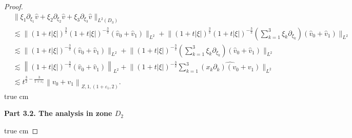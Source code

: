 \documentclass[11pt,twoside]{article}
\newcommand{\p}{\partial}
\newcommand{\f}{\frac}
\theoremstyle{plain}
\theoremstyle{definition}
\theoremstyle{remark}
\numberwithin{equation}{section}
\begin{document}
\begin{proof}
\begin{equation}
\begin{aligned}
&\big\|\xi_1\p_{\xi_1}\hat{v}+\xi_2\p_{\xi_2}\hat{v}+\xi_3\p_{\xi_3}\hat{v}\big\|_{L^2(D_3)}\\
&\lesssim \big\|(1+t|\xi|)^{\f32}(1+t|\xi|)^{-\f32}(\hat{v}_{0}+\hat{v}_{1})\big\|_{L^{2}}+ \big\|(1+t|\xi|)^{\f32}(1+t|\xi|)^{-\f32}(\sum_{k=1}^3\xi_k\p_{\xi_k})(\hat{v}_{0}+\hat{v}_{1})\big\|_{L^{2}}\\
&\lesssim \big\|(1+t|\xi|)^{-\f32}(\hat{v}_{0}+\hat{v}_{1})\big\|_{L^{2}}+ \big\|(1+t|\xi|)^{-\f32}(\sum_{k=1}^3\xi_k\p_{\xi_k})(\hat{v}_{0}+\hat{v}_{1})\big\|_{L^{2}}\\
& \lesssim \left\|(1+t|\xi|)^{-\f{3}{2}}(\hat{v}_{0}+\hat{v}_{1})\right\|_{L^{2}}+
\big\|(1+t|\xi|)^{-\f{3}{2}}\sum_{k=1}^3\widehat{(x_k\p_k)(v_0+v_1)}\big\|_{L^{2}}\\
&\lesssim  t^{\f32-\f{3}{1+\varepsilon_1}}\left\|v_0+v_1\right\|_{Z, 1,(1+\varepsilon_1, 2)}.
\end{aligned}
\end{equation}
 true cm

{\bf Part 3.2.  The analysis  in zone $D_2$}

 true cm


\end{proof}
\end{document}
